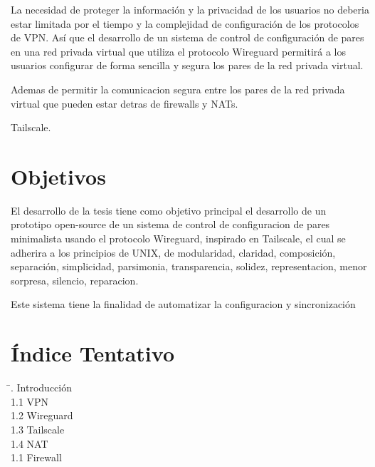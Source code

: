 \documentclass[letterpaper,12pt,oneside]{book}
\begin{document}
\begin{itemize}
La necesidad de proteger la información y la privacidad de los usuarios no deberia estar limitada por el tiempo y la complejidad de configuración de los protocolos de VPN. Así que el desarrollo de un sistema de control de configuración de pares en una red privada virtual que utiliza el protocolo Wireguard permitirá a los usuarios configurar de forma sencilla y segura los pares de la red privada virtual.

Ademas de permitir la comunicacion segura entre los pares de la red privada virtual que pueden estar detras de firewalls y NATs.

Tailscale.



\section{Objetivos}

El desarrollo de la tesis tiene como objetivo principal el desarrollo de un prototipo open-source de un sistema de control de configuracion de pares minimalista usando el protocolo Wireguard, inspirado en Tailscale, el cual se adherira a los principios de UNIX, de modularidad, claridad, composición, separación, simplicidad, parsimonia, transparencia, solidez, representacion, menor sorpresa, silencio, reparacion.

Este sistema tiene la finalidad de automatizar la configuracion y sincronización 


\section{Índice Tentativo}
\begin{flushleft}
    \begin{tabbing}
    \hspace{4cm} \= . Introducción \> \dotfill  \\
    \hspace{0.5cm}1.1 VPN \> \dotfill  \\
    \hspace{0.5cm}1.2 Wireguard \> \dotfill  \\
    \hspace{0.5cm}1.3 Tailscale \> \dotfill  \\
    \hspace{0.5cm}1.4 NAT \> \dotfill  \\
    \hspace{0.5cm}1.1 Firewall \> \dotfill  \\


\end{tabbing}
\end{flushleft}
\end{itemize}
\end{document}
